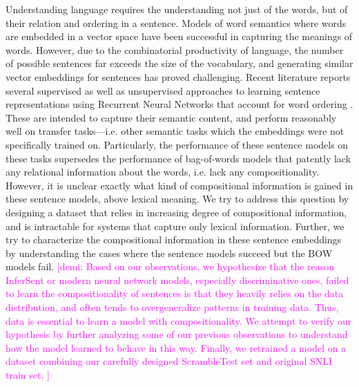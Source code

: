 \documentclass[10pt,letterpaper]{article}
\newcommand{\demi}[1]{\textcolor{magenta}{[demi: #1]}}
\begin{document}
Understanding language requires the understanding not just of the words, but of their relation and ordering in a sentence. Models of word semantics where words are embedded in a vector space have been successful in capturing the meanings of words. However, due to the combinatorial productivity of language, the number of possible sentences far exceeds the size of the vocabulary, and generating similar vector embeddings for sentences has proved challenging. Recent literature reports several supervised as well as unsupervised approaches to learning sentence representations using Recurrent Neural Networks that account for word ordering \citep{Kiros:2015uq, Hill:2016uu, Conneau:2017uf}. These are intended to capture their semantic content, and perform reasonably well on transfer tasks---i.e. other semantic tasks which the embeddings were not specifically trained on. Particularly, the performance of these sentence models on these tasks supersedes the performance of bag-of-words models that patently lack any relational information about the words, i.e. lack any compositionality. However, it is unclear exactly what kind of compositional information is gained in these sentence models, above lexical meaning. We try to address this question by designing a dataset that relies in increasing degree of compositional information, and is intractable for systems that capture only lexical information. Further, we try to characterize the compositional information in these sentence embeddings by understanding the cases where the sentence models succeed but the BOW models fail. \demi{Based on our observations, we hypothesize that the reason InferSent or modern neural network models, especially discriminative ones, failed to learn the compositionality of sentences is that they heavily relies on the data distribution, and often tends to overgeneralize patterns in training data. Thus, data is essential to learn a model with compositionality. We attempt to verify our hypothesis by further analyzing some of our previous observations to understand how the model learned to behave in this way. Finally, we retrained a model on a dataset combining our carefully designed ScrambleTest set and original SNLI train set. }
\end{document}
